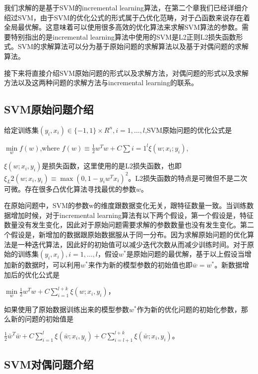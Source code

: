 \documentclass[master]{njuthesis}
\begin{document}
    我们求解的是基于SVM的incremental learning算法，在第二个章我们已经详细介绍过SVM，由于SVM的优化公式的形式属于凸优化范畴，对于凸函数来说存在着全局最优解。这意味着可以使用很多高效的优化算法来求解SVM算法的参数。需要特别指出的是incremental learning算法中使用的SVM是L2正则L2损失函数形式。SVM的求解算法可以分为基于原始问题的求解算法以及基于对偶问题的求解算法。

    接下来将直接介绍SVM原始问题的形式以及求解方法，对偶问题的形式以及求解方法以及这两种问题的求解方法与incremental learning的联系。

\subsection{SVM原始问题介绍}

    给定训练集$\left(y_i,x_i\right) \in \{-1, 1\} \times R^n, i = 1,\dots,l$,SVM原始问题的优化公式是

    $\min\limits_{w} f\left(w\right)$,where $f\left(w\right)\equiv \frac{1}{2}w^Tw + C\sum{i=1}^l \xi\left(w;x_i;y_i\right)$, 

    $\xi\left(w;x_i,y_i\right)$是损失函数，这里使用的是L2损失函数，也即$\xi_L2\left(w;x_i,y_i\right) \equiv \max\left(0,1-y_iw^Tx_i\right)^2$。L2损失函数的特点是可微但不是二次可微。存在很多凸优化算法寻找最优的参数$w$。

   在原始问题中，SVM的参数w的维度跟数据变化无关，跟特征数量一致。当训练数据增加时候，对于incremental learning算法有以下两个假设，第一个假设是，特征数量没有发生变化，因此对于原始问题需要求解的参数数量也没有发生变化。第二个假设是，新增加的数据跟原始数据服从于同一分布。因为求解原始问题的优化算法是一种迭代算法，因此好的初始值可以减少迭代次数从而减少训练时间。对于原始的训练集$\left(y_i,x_i\right),i=1,\dots,l$，假设$w^*$是原始问题的最优解，基于以上假设当增加新的数据时，可以利用$w^*$来作为新的模型参数的初始值也即$\bar{w}=w^*$。新数据增加后的优化公式是

    $\min\limits_{w} \frac{1}{2}w^Tw+C\sum_{i=1}^{l+k} \xi\left(w;x_i,y_i\right)$，

    如果使用了原始数据训练出来的模型参数$w^\ast$作为新的优化问题的初始化参数，那么新的问题的初始值是

    $\frac{1}{2}\bar{w}^T\bar{w}+C\sum_{i=1}^l
\xi\left(\bar{w};x_i,y_i\right)+C\sum_{i=l+1}^{l+k}\xi\left(\bar{w};x_i,y_i\right)$。

\subsection{SVM对偶问题介绍}
    
\end{document}
